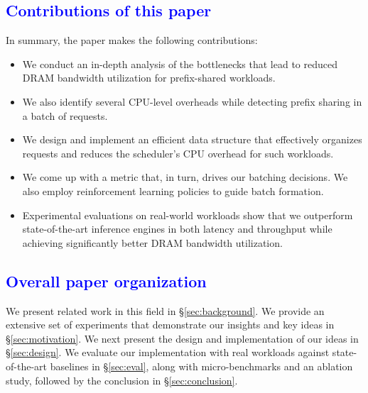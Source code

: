 \subsection{\textcolor{blue}{Contributions of this paper}}
In summary, the paper makes the following contributions:
\begin{itemize}
    \item We conduct an in-depth analysis of the bottlenecks that lead to reduced DRAM bandwidth utilization for prefix-shared workloads.
    \item We also identify several CPU-level overheads while detecting prefix sharing in a batch of requests.
    \item We design and implement an efficient data structure that effectively organizes requests and reduces the scheduler's CPU overhead for such workloads.
    \item We come up with a metric that, in turn, drives our batching decisions. We also employ reinforcement learning policies to guide batch formation.
    \item Experimental evaluations on real-world workloads show that we outperform state-of-the-art inference engines in both latency and throughput while achieving significantly better DRAM bandwidth utilization.
\end{itemize}

\subsection{\textcolor{blue}{Overall paper organization}}
We present related work in this field in \S\ref{sec:background}. We provide an extensive set of experiments that demonstrate our insights and key ideas in \S\ref{sec:motivation}. We next present the design and implementation of our ideas in \S\ref{sec:design}. We evaluate our implementation with real workloads against state-of-the-art baselines in \S\ref{sec:eval}, along with micro-benchmarks and an ablation study, followed by the conclusion in \S\ref{sec:conclusion}.